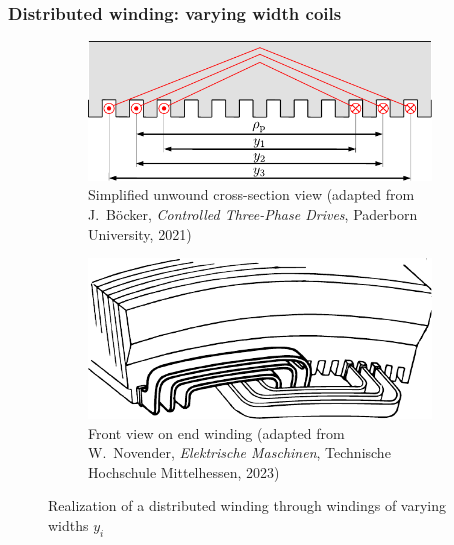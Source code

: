 \begin{frame}
	\frametitle{Distributed winding: varying width coils}
    \begin{figure}
		\centering
		\begin{subfigure}[b]{0.49\textwidth}
			\centering
			\includegraphics[height=0.35\textheight]{fig/lec05/Distributed_winding_different_width_01.pdf}
			\caption{Simplified unwound cross-section view (adapted from J.~B\"ocker, \textit{Controlled Three-Phase Drives}, Paderborn University, 2021)}
		\end{subfigure}
		\hfill
		\begin{subfigure}[b]{0.49\textwidth}
			\centering
			\includegraphics[height=0.35\textheight]{fig/lec05/Distributed_winding_different_width_02.pdf}
			\caption{Front view on end winding  (adapted from W.~Novender, \textit{Elektrische Maschinen}, Technische Hochschule Mittelhessen, 2023)}
		\end{subfigure}
		\caption{Realization of a distributed winding through windings of varying widths $y_i$} 
        \label{fig:Distributed_winding_different_width}
	\end{figure}
\end{frame}

